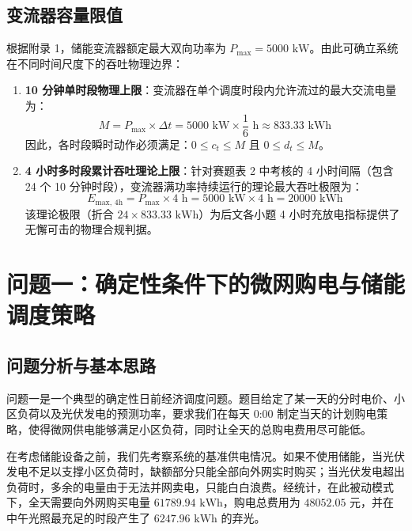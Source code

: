 \documentclass[withoutpreface]{cumcmthesis}
\begin{document}
\subsection{变流器容量限值}
根据附录 1，储能变流器额定最大双向功率为 $P_{\max} = 5000\text{ kW}$。由此可确立系统在不同时间尺度下的吞吐物理边界：
\begin{enumerate}
    \item \textbf{10 分钟单时段物理上限}：变流器在单个调度时段内允许流过的最大交流电量为：
    \begin{equation}
        M = P_{\max} \times \Delta t = 5000\text{ kW} \times \frac{1}{6}\text{ h} \approx 833.33\text{ kWh}
    \end{equation}
    因此，各时段瞬时动作必须满足：$0 \le c_t \le M$ 且 $0 \le d_t \le M$。
    
    \item \textbf{4 小时多时段累计吞吐理论上限}：针对赛题表 2 中考核的 4 小时间隔（包含 24 个 10 分钟时段），变流器满功率持续运行的理论最大吞吐极限为：
    \begin{equation}
        E_{\text{max, 4h}} = P_{\max} \times 4\text{ h} = 5000\text{ kW} \times 4\text{ h} = 20000\text{ kWh}
    \end{equation}
    该理论极限（折合 $24 \times 833.33\text{ kWh}$）为后文各小题 4 小时充放电指标提供了无懈可击的物理合规判据。
\end{enumerate}

\section{问题一：确定性条件下的微网购电与储能调度策略}

\subsection{问题分析与基本思路}
问题一是一个典型的确定性日前经济调度问题。题目给定了某一天的分时电价、小区负荷以及光伏发电的预测功率，要求我们在每天 0:00 制定当天的计划购电策略，使得微网供电能够满足小区负荷，同时让全天的总购电费用尽可能低。

在考虑储能设备之前，我们先考察系统的基准供电情况。如果不使用储能，当光伏发电不足以支撑小区负荷时，缺额部分只能全部向外网实时购买；当光伏发电超出负荷时，多余的电量由于无法并网卖电，只能白白浪费。经统计，在此被动模式下，全天需要向外网购买电量 $61789.94\text{ kWh}$，购电总费用为 $48052.05\text{ 元}$，并在中午光照最充足的时段产生了 $6247.96\text{ kWh}$ 的弃光。
\end{document}
